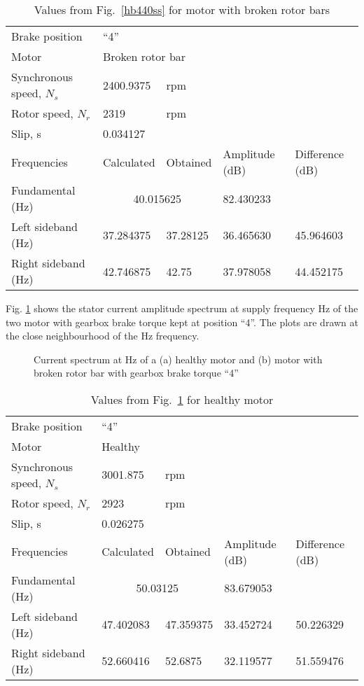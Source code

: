 \documentclass[a4paper,11pt]{report}
\begin{document}
\begin{table}[h]
\centering
\begin{tabular}{lllll}
Brake position	& ``4'' & & & \\			
Motor &	\multicolumn{4}{l}{Broken rotor	bar} \\ 
Synchronous speed, $N_{s}$	& 2400.9375	& rpm & & \\			
Rotor speed, $N_{r}$ 	  	& 2319	& rpm& & \\		
Slip, s			  	&  \multicolumn{4}{l}{0.034127} \\			
Frequencies 		  	& Calculated & Obtained & Amplitude (dB) & Difference (dB) \\
Fundamental (Hz)		& \multicolumn{2}{c}{40.015625 }& 82.430233 &  \\ 
Left sideband (Hz) 		& 37.284375 & 37.28125 & 36.465630 & 45.964603 \\
Right sideband (Hz)		&  42.746875 & 42.75 &   37.978058 & 44.452175
\end{tabular}
\caption{Values from Fig.~\ref{hb440ss} for motor with broken rotor bars} \label{b440sst}
\end{table}

\clearpage
Fig. \ref{hb450ss} shows the stator current amplitude spectrum at supply frequency \unit[50]{Hz} of the two motor with gearbox brake torque kept at position ``4''. The plots are drawn at the close neighbourhood of the \unit[50]{Hz} frequency.

\begin{figure}[htbp]
\centering
\subfigure[]{\texttt{[image: h450]}}
\subfigure[]{\texttt{[image: b450]}}
\caption{Current spectrum at \unit[50]{Hz} of a (a) healthy motor and (b) motor with broken rotor bar with gearbox brake torque ``4''} \label{hb450ss}
\end{figure}

\begin{table}[h]
\centering
\begin{tabular}{lllll}
Brake position	& ``4'' & & & \\			
Motor &	\multicolumn{4}{l}{Healthy} \\ 
Synchronous speed, $N_{s}$	&3001.875  & rpm & & \\			
Rotor speed, $N_{r}$ 	  	& 2923	& rpm& & \\		
Slip, s			  	&  \multicolumn{4}{l}{0.026275} \\			
Frequencies 		  	& Calculated & Obtained & Amplitude (dB) & Difference (dB) \\
Fundamental (Hz)		& \multicolumn{2}{c}{50.03125}	& 83.679053 &  \\ 
Left sideband (Hz) 		& 47.402083 & 47.359375 & 33.452724 & 50.226329 \\
Right sideband (Hz)		& 52.660416 & 52.6875 &   32.119577 & 51.559476
\end{tabular}
\caption{Values from Fig.~\ref{hb450ss} for healthy motor} \label{h450sst}
\end{table}
\end{document}
